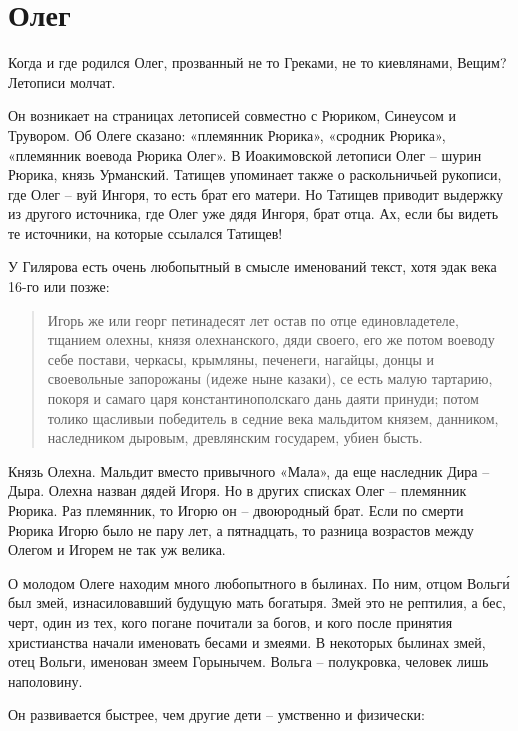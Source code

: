 \chapter{Олег}

Когда и где родился Олег, прозванный не то Греками, не то киевлянами, Вещим? Летописи молчат.

Он возникает на страницах летописей совместно с Рюриком, Синеусом и Трувором. Об Олеге сказано: «племянник Рюрика», «сродник Рюрика», «племянник воевода Рюрика Олег». В Иоакимовской летописи Олег – шурин Рюрика, князь Урманский. Татищев упоминает также о раскольничьей рукописи, где Олег – вуй Ингоря, то есть брат его матери. Но Татищев приводит выдержку из другого источника, где Олег уже дядя Ингоря, брат отца. Ах, если бы видеть те источники, на которые ссылался Татищев!

У Гилярова\cite[стр. 212]{gilyarov01} есть очень любопытный в смысле именований текст, хотя эдак века 16-го или позже:

\begin{quotation}
Игорь же или георг петинадесят лет остав по отце единовладетеле, тщанием олехны, князя олехнанского, дяди своего, его же потом воеводу себе постави, черкасы, крымляны, печенеги, нагайцы, донцы и своевольные запорожаны (идеже ныне казаки), се есть малую тартарию, покоря и самаго царя константинополскаго дань даяти принуди; потом толико щасливыи победитель в седние века мальдитом князем, данником, наследником дыровым, древлянским государем, убиен бысть.
\end{quotation}

Князь Олехна. Мальдит вместо привычного «Мала», да еще наследник Дира – Дыра. Олехна назван дядей Игоря. Но в других списках Олег – племянник Рюрика. Раз племянник, то Игорю он – двоюродный брат. Если по смерти Рюрика Игорю было не пару лет, а пятнадцать, то разница возрастов между Олегом и Игорем не так уж велика.


О молодом Олеге находим много любопытного в былинах. По ним, отцом Вольг\'и был змей, изнасиловавший будущую мать богатыря. Змей это не рептилия, а бес, черт, один из тех, кого погане почитали за богов, и кого после принятия христианства начали именовать бесами и змеями. В некоторых былинах змей, отец Вольги, именован змеем Горынычем. Вольга – полукровка, человек лишь наполовину.

Он развивается быстрее, чем другие дети – умственно и физически\cite[стр. 1]{rybnikov01}:


